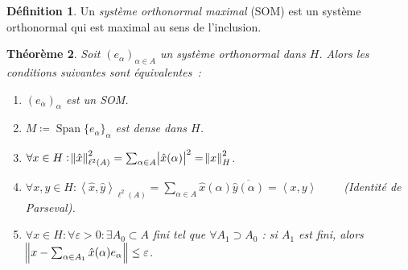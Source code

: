 \documentclass{report}
\DeclareMathOperator{\Span}{Span}
\newcommand{\scpr}[2]{\left\langle#1, #2\right\rangle}
\newtheorem{thm}{Théorème}[chapter]
\theoremstyle{definition}
\newtheorem{déf}[thm]{Définition}
\theoremstyle{remark}
\begin{document}
\begin{déf} Un \textit{système orthonormal maximal} (SOM) est un système orthonormal qui est maximal au sens de l'inclusion.
\end{déf}

\begin{thm}\label{thm:caractérisation SOM} Soit $(e_\alpha)_{\alpha \in A}$ un système orthonormal dans $H$. Alors les conditions suivantes sont équivalentes~:
\begin{enumerate}
	\item $(e_\alpha)_\alpha$ est un SOM.
	\item $M \coloneqq \Span \{e_\alpha\}_\alpha$ est dense dans $H$.
	\item $\forall x \in H : \norm {\hat x}_{\ell^2(A)}^2 = \sum_{\alpha \in A}\abs {\hat x(\alpha)}^2 = \norm x^2_H$.
	\item $\forall x, y \in H : \scpr {\hat x}{\hat y}_{\ell^2(A)} = \sum_{\alpha \in A}\hat x(\alpha)\overline {\hat y(\alpha)} = \scpr xy \qquad$ (Identité de Parseval).
	\item $\forall x \in H : \forall \varepsilon > 0 : \exists A_0 \subset A$ fini tel que $\forall A_1 \supset A_0$ : si $A_1$ est fini, alors $\norm {x - \sum_{\alpha \in A_1}\hat x(\alpha)e_\alpha} \leq \varepsilon$.
\end{enumerate}
\end{thm}
\end{document}
